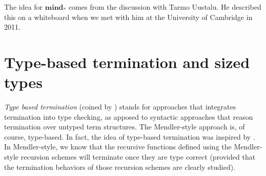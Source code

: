 The idea for $\textbf{mind}_{*}$ comes from
the discussion with Tarmo Uustalu. He described this on a whiteboard
     when we met with him at the University of Cambridge in 2011.

\section{Type-based termination and sized types}
\emph{Type based termination} (coined by \citet{BartheFGPU04}) stands for
approaches that integrates termination into type checking, as apposed to
syntactic approaches that reason termination over untyped term structures.
The Mendler-style approach is, of course, type-based.  In fact, the idea of
type-based termination was inspired by \citet{Mendler87,Mendler91}.
In Mendler-style, we know that the recursive functions defined using
the Mendler-style recursion schemes will terminate once they are
type correct (provided that the termination behaviors of
those recursion schemes are clearly studied).


